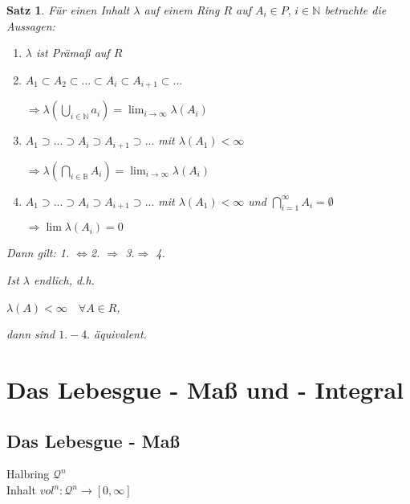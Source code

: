 \documentclass[11pt]{memoir}
\theoremstyle{changebreak}
\newtheorem{Satz}{Satz}[chapter]
\begin{document}
\begin{Satz}
Für einen Inhalt $\lambda$ auf einem Ring $R$ auf $A_i \in P,\, i \in \mathbb N$ betrachte die Aussagen:
\begin{enumerate}
	\item $\lambda$ ist Prämaß auf $R$
	\item $A_1 \subset A_2 \subset ... \subset A_i \subset A_{i+1} \subset ...$
	\begin{center}
		$\Rightarrow \lambda\left( \bigcup_{i \in \mathbb N} a_i \right) = \lim_{i \rightarrow \infty} \lambda(A_i)$
	\end{center}
	\item $A_1 \supset ... \supset A_i \supset A_{i+1} \supset ...$ mit $\lambda(A_1) < \infty$
	\begin{center}
		$\Rightarrow \lambda\left(\bigcap_{i \in \mathbb B} A_i \right) = \lim_{i\rightarrow \infty} \lambda(A_i)$
	\end{center}
	\item $A_1 \supset ... \supset A_i \supset A_{i+1} \supset ...$ mit $\lambda(A_1) <  \infty$ und $\bigcap\limits_{i=1}^\infty A_i = \emptyset$
	\begin{center}
		$\Rightarrow \lim \lambda(A_i) = 0$
	\end{center}
\end{enumerate}
Dann gilt: 1. $\Leftrightarrow $2. $\Rightarrow$ 3.$ \Rightarrow $ 4. 
\par\bigskip
Ist $\lambda$ endlich, d.h. 
\begin{center}
	$\lambda(A) < \infty \quad \forall A \in R$, 
\end{center}	
dann sind $1. - 4.$ äquivalent.
\end{Satz}


\newpage










\chapter{Das Lebesgue - Maß und - Integral}
\section{Das Lebesgue - Maß}

Halbring $\mathscr{Q}^n$ \\
Inhalt $vol^n : \mathscr{Q}^n \rightarrow [0, \infty]$
\end{document}
